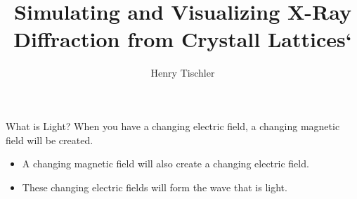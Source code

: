 \documentclass{beamer}
\title {Simulating and Visualizing X-Ray Diffraction from Crystall Lattices`}
\author{Henry Tischler}
\institute[Institute of Computing in Research]
\begin{document}
	\titlepage


\begin {frame}{What is Light?}
	When you have a changing electric field, a changing magnetic field will be created.

	\begin{itemize}
	\item A changing magnetic field will also create a changing electric field.
	\item These changing electric fields will form the wave that is light.
	\end{itemize}		
\end{frame}

\begin {frame}

\end{frame}
\end{document}
